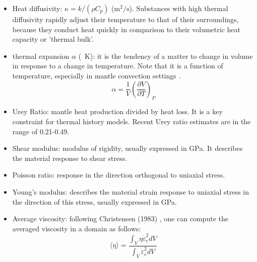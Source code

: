 \begin{itemize}
\item {\color{violet} Heat diffusivity}: $\kappa=k/(\rho C_p)$ ($\si{\square\meter\per\second}$). 
Substances with high thermal diffusivity rapidly adjust their temperature to that of their surroundings, because they 
conduct heat quickly in comparison to their volumetric heat capacity or 'thermal bulk'.

\item {\color{violet} thermal expansion} $\alpha$ (\si{\per\kelvin}): 
it is the tendency of a matter to change in volume in response to a change in temperature. 
Note that it is a function of temperature, especially in mantle convection settings \cite{mika13}.
\[
\alpha = \frac{1}{V} \left(\frac{\partial V}{\partial T}\right)_P
\]


\item {\color{violet} Urey Ratio}: mantle heat production divided by heat loss. It is a key constraint 
for thermal history models. Recent Urey ratio estimates are in the range of 0.21-0.49. \cite{lecm11}

\item {\color{violet} Shear modulus}: modulus of rigidity, usually expressed in \si{\giga\pascal}. 
It describes the material response to shear stress.

\item {\color{violet} Poisson ratio}: response in the direction orthogonal to uniaxial stress.

\item {\color{violet} Young's modulus}: describes the material strain response to uniaxial stress
in the direction of this stress, usually expressed in \si{\giga\pascal}.

\item {\color{violet} Average viscosity}: following Christensen (1983) \cite{chri83}, 
one can compute the averaged viscosity in a domain as follows:
\begin{equation}
\langle \eta \rangle = \frac{\int_V \eta \dot{\varepsilon}_e^2 dV}{\int_V  \dot{\varepsilon}_e^2 dV }
\label{eq:avrgeta}
\end{equation}

\end{itemize}




